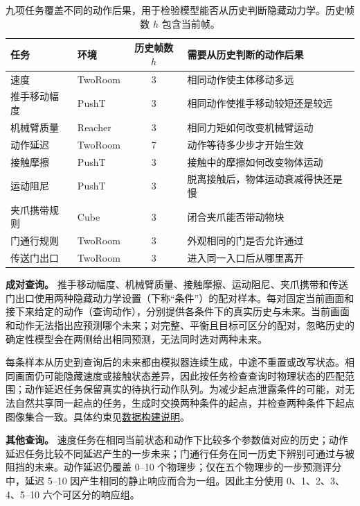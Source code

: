 \documentclass[10pt,twocolumn,letterpaper]{article}
\begin{document}
\begin{table}[t]
\centering
\caption{九项任务覆盖不同的动作后果，用于检验模型能否从历史判断隐藏动力学。历史帧数 $h$ 包含当前帧。}
\label{tab:tasks}
\begin{tabularx}{\textwidth}{@{}llcX@{}}
\toprule
任务 & 环境 & 历史帧数 $h$ & 需要从历史判断的动作后果 \\
\midrule
速度 & TwoRoom & 3 & 相同动作使主体移动多远 \\
推手移动幅度 & PushT & 3 & 相同动作使推手移动较短还是较远 \\
机械臂质量 & Reacher & 3 & 相同力矩如何改变机械臂运动 \\
动作延迟 & TwoRoom & 7 & 动作等待多少步才开始生效 \\
接触摩擦 & PushT & 3 & 接触中的摩擦如何改变物体运动 \\
运动阻尼 & PushT & 3 & 脱离接触后，物体运动衰减得快还是慢 \\
夹爪携带规则 & Cube & 3 & 闭合夹爪能否带动物块 \\
门通行规则 & TwoRoom & 3 & 外观相同的门是否允许通过 \\
传送门出口 & TwoRoom & 3 & 进入同一入口后从哪里离开 \\
\bottomrule
\end{tabularx}
\end{table}

\textbf{成对查询。} 推手移动幅度、机械臂质量、接触摩擦、运动阻尼、夹爪携带和传送门出口使用两种隐藏动力学设置（下称“条件”）的配对样本。每对固定当前画面和接下来给定的动作（查询动作），分别提供各条件下的真实历史与未来。当前画面和动作无法指出应预测哪个未来；对完整、平衡且目标可区分的配对，忽略历史的确定性模型会在两侧给出相同预测，无法同时选对两种未来。

每条样本从历史到查询后的未来都由模拟器连续生成，中途不重置或改写状态。相同画面仍可能隐藏速度或接触状态差异，因此按任务检查查询时物理状态的匹配范围；动作延迟任务保留真实的待执行动作队列。为减少起点泄露条件的可能，对无法自然共享同一起点的任务，生成时交换两种条件的起点，并检查两种条件下起点图像集合一致。具体约束见\href{https://github.com/Anguo-star/ContextWorld/blob/main/docs/Data_Generation.md}{数据构建说明}。

\textbf{其他查询。} 速度任务在相同当前状态和动作下比较多个参数值对应的历史；动作延迟任务比较不同延迟产生的一步未来；门通行任务在同一历史下辨别可通过与被阻挡的未来。动作延迟仍覆盖 0–10 个物理步；仅在五个物理步的一步预测评分中，延迟 5–10 因产生相同的静止响应而合为一组。因此主分使用 0、1、2、3、4、5–10 六个可区分的响应组。
\end{document}
